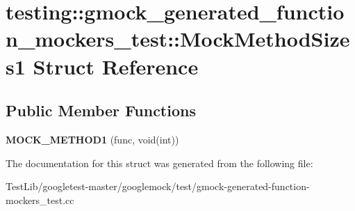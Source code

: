 \hypertarget{structtesting_1_1gmock__generated__function__mockers__test_1_1MockMethodSizes1}{}\section{testing\+:\+:gmock\+\_\+generated\+\_\+function\+\_\+mockers\+\_\+test\+:\+:Mock\+Method\+Sizes1 Struct Reference}
\label{structtesting_1_1gmock__generated__function__mockers__test_1_1MockMethodSizes1}
\subsection*{Public Member Functions}
\begin{DoxyCompactItemize}
\item 
\mbox{\label{structtesting_1_1gmock__generated__function__mockers__test_1_1MockMethodSizes1_af4d80458626303520a848ad15e0e8121}} 
{\bfseries M\+O\+C\+K\+\_\+\+M\+E\+T\+H\+O\+D1} (func, void(int))
\end{DoxyCompactItemize}


The documentation for this struct was generated from the following file\+:\begin{DoxyCompactItemize}
\item 
Test\+Lib/googletest-\/master/googlemock/test/gmock-\/generated-\/function-\/mockers\+\_\+test.\+cc\end{DoxyCompactItemize}
